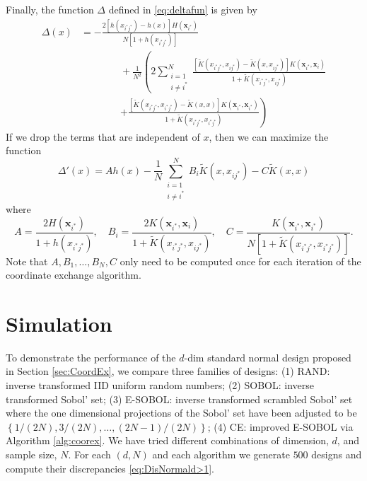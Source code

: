 \documentclass[graybox]{svmult}
\newcommand{\vx}{\boldsymbol{x}}
\newcommand{\tK}{\widetilde{K}}
\begin{document}
Finally, the  function $\Delta$ defined in \eqref{eq:deltafun} is given by
\begin{align}\label{eq:deltafunction}
\nonumber
\Delta(x)
&= -\frac{2\left[  h(x_{i^*j^*})-h(x)    \right]H(\vx_{i^*})}{N[1 + h(x_{i^*j^*})]}   \\
\nonumber
& \qquad \qquad +\frac{1}{N^2}\left(2\sum_{\substack{i=1 \\ i \ne i^*}}^N  \frac{[\tK(x_{i^*j^*},x_{ij^*})-\tK(x,x_{ij^*})] K(\vx_{i^*},\vx_i)} {1 + \tK(x_{i^*j^*},x_{ij^*})} \right . \\
\nonumber
& \qquad \qquad \left . + \frac{[\tK(x_{i^*j^*},x_{i^*j^*})-\tK(x,x)] K(\vx_{i^*},\vx_{i^*})} {1 + \tK(x_{i^*j^*},x_{i^*j^*})} \right )
\end{align} 
If we drop the terms that are independent of $x$, then we can maximize the function
\begin{equation*} %
\Delta'(x) = Ah(x)  - \frac{1}{N}\sum_{\substack{i=1 \\ i \ne i^*}}^N B_i \tK(x,x_{ij^*}) - C \tK(x,x)
\end{equation*}
where
\begin{equation*}
A = \frac{2H(\vx_{i^*})}{1 + h(x_{i^*j^*})}, \quad
B_i  = \frac{2K(\vx_{i^*},\vx_i)} {1 + \tK(x_{i^*j^*},x_{ij^*})}, \quad
C  = \frac{K(\vx_{i^*},\vx_{i^*})} {N[1 + \tK(x_{i^*j^*},x_{i^*j^*})]}.
\end{equation*}
Note that $A, B_1, \ldots, B_N, C$ only need to be computed once for each iteration of the coordinate exchange algorithm.


\section{Simulation} \label{sec:Simulation}

To demonstrate the performance of the $d$-dim standard normal design proposed in Section \ref{sec:CoordEx}, we compare three families of designs: (1) RAND: inverse transformed IID uniform random numbers;  (2) SOBOL: inverse transformed Sobol' set; (3) E-SOBOL: inverse transformed scrambled Sobol' set where the one dimensional projections of the Sobol' set have been adjusted to be  $\left\{1/(2N), 3/(2N), \ldots, (2N-1)/(2N) \right\}$; (4) CE: improved E-SOBOL via Algorithm \ref{alg:coorex}. 
We have tried different combinations of dimension, $d$, and sample size, $N$. 
For each $(d,N)$ and each algorithm we generate $500$ designs and compute their discrepancies \eqref{eq:DisNormald>1}.  
\end{document}
